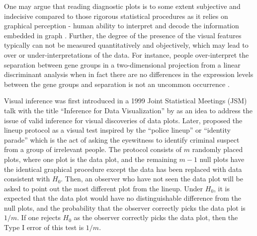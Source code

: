 \documentclass[]{interact}
\theoremstyle{plain}%
\theoremstyle{definition}
\theoremstyle{remark}
\begin{document}
One may argue that reading diagnostic plots is to some extent subjective
and indecisive compared to those rigorous statistical procedures as it
relies on graphical perception - human ability to interpret and decode
the information embedded in graph \citep{cleveland_graphical_1984}.
Further, the degree of the presence of the visual features typically can
not be measured quantitatively and objectively, which may lead to over
or under-interpretations of the data. For instance, people
over-interpret the separation between gene groups in a two-dimensional
projection from a linear discriminant analysis when in fact there are no
differences in the expression levels between the gene groups and
separation is not an uncommon occurrence
\citep{roy_chowdhury_using_2015}.

Visual inference was first introduced in a 1999 Joint Statistical
Meetings (JSM) talk with the title ``Inference for Data Visualization''
by \citet{buja_inference_1999} as an idea to address the issue of valid
inference for visual discoveries of data plots. Later,
\citet{buja_statistical_2009} proposed the lineup protocol as a visual
test inspired by the ``police lineup'' or ``identity parade'' which is
the act of asking the eyewitness to identify criminal suspect from a
group of irrelevant people. The protocol consists of \(m\) randomly
placed plots, where one plot is the data plot, and the remaining
\(m - 1\) null plots have the identical graphical procedure except the
data has been replaced with data consistent with \(H_0\). Then, an
observer who have not seen the data plot will be asked to point out the
most different plot from the lineup. Under \(H_0\), it is expected that
the data plot would have no distinguishable difference from the null
plots, and the probability that the observer correctly picks the data
plot is \(1/m\). If one rejects \(H_0\) as the observer correctly picks
the data plot, then the Type I error of this test is \(1/m\).
\end{document}

